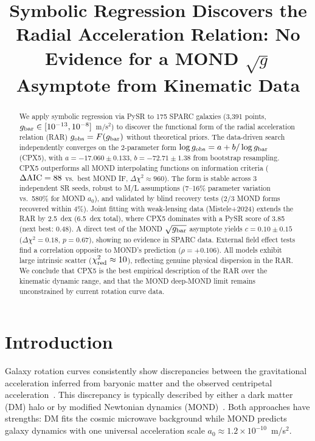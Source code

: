 \documentclass[twocolumn]{aastex631}
\begin{document}
\title{Symbolic Regression Discovers the Radial Acceleration Relation:
No Evidence for a MOND $\surd g$ Asymptote from Kinematic Data}

\author{}

\begin{abstract}
We apply symbolic regression via PySR to 175 SPARC galaxies (3,391 points,
$g_{\rm bar} \in [10^{-13},10^{-8}]$~m/s$^2$) to discover the functional form
of the radial acceleration relation (RAR) $g_{\rm obs} = F(g_{\rm bar})$
without theoretical priors.  The data-driven search independently converges on
the 2-parameter form $\log g_{\rm obs} = a + b/\log g_{\rm bar}$ (CPX5), with
$a = -17.060 \pm 0.133$, $b = -72.71 \pm 1.38$ from bootstrap resampling.
CPX5 outperforms all MOND interpolating functions on information criteria
($\Delta{\rm AIC} = 88$ vs.\ best MOND IF, $\Delta\chi^2 \approx 960$).  The form is stable across 3 independent SR
seeds, robust to M/L assumptions (7--16\% parameter variation vs.\ 580\%
for MOND $a_0$), and validated by blind recovery tests (2/3 MOND forms
recovered within 4\%).  Joint fitting with weak-lensing data (Mistele+2024)
extends the RAR by 2.5~dex (6.5~dex total), where CPX5 dominates with a
PySR score of 3.85 (next best: 0.48).  A direct test of the MOND
$\sqrt{g_{\rm bar}}$ asymptote yields $c = 0.10 \pm 0.15$ ($\Delta\chi^2 =
0.18$, $p=0.67$), showing no evidence in SPARC data.  External field effect
tests find a correlation opposite to MOND's prediction ($\rho = +0.106$).
All models exhibit large intrinsic scatter ($\chi^2_{\rm red}\approx
10$), reflecting genuine physical dispersion in the RAR.  We conclude that
CPX5 is the best empirical description of the RAR over the kinematic dynamic
range, and that the MOND deep-MOND limit remains unconstrained by current
rotation curve data.
\end{abstract}

\section{Introduction}

Galaxy rotation curves consistently show discrepancies between the
gravitational acceleration inferred from baryonic matter and the observed
centripetal acceleration~\cite{rubin1978,bosma1981}.  This discrepancy is
typically described by either a dark matter (DM) halo or by modified
Newtonian dynamics (MOND)~\cite{milgrom1983,mcgaugh2016}.  Both approaches
have strengths: DM fits the cosmic microwave background while MOND predicts
galaxy dynamics with one universal acceleration scale $a_0 \approx 1.2\times
10^{-10}$~m/s$^2$.
\end{document}
